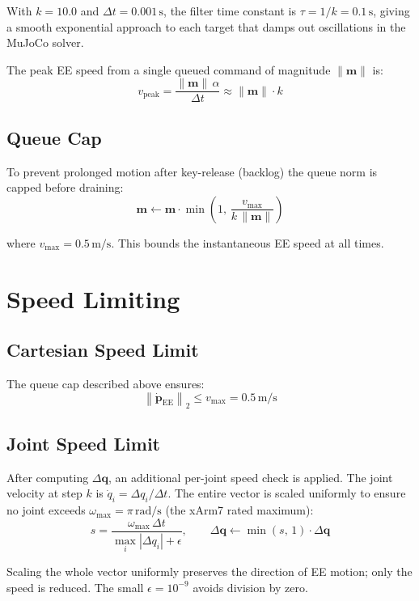 \documentclass[11pt, a4paper]{article}
\begin{document}
With $k = 10.0$ and $\Delta t = 0.001\,\text{s}$, the filter time constant is $\tau = 1/k = 0.1\,\text{s}$, giving a smooth exponential approach to each target that damps out oscillations in the MuJoCo solver.

The peak EE speed from a single queued command of magnitude $\|\mathbf{m}\|$ is:
\[
  v_{\text{peak}} = \frac{\|\mathbf{m}\|\,\alpha}{\Delta t} \approx \|\mathbf{m}\| \cdot k
\]

\subsection{Queue Cap}

To prevent prolonged motion after key-release (backlog) the queue norm is capped before draining:
\[
  \mathbf{m} \leftarrow \mathbf{m}\cdot\min\!\left(1,\,\frac{v_{\max}}{k\,\|\mathbf{m}\|}\right)
\]

where $v_{\max} = 0.5\,\text{m/s}$. This bounds the instantaneous EE speed at all times.

\section{Speed Limiting}

\subsection{Cartesian Speed Limit}

The queue cap described above ensures:
\[
  \left\|\dot{\mathbf{p}}_{\text{EE}}\right\|_2 \leq v_{\max} = 0.5\,\text{m/s}
\]

\subsection{Joint Speed Limit}

After computing $\Delta \mathbf{q}$, an additional per-joint speed check is applied. The joint velocity at step $k$ is $\dot{q}_i = \Delta q_i / \Delta t$. The entire vector is scaled uniformly to ensure no joint exceeds $\omega_{\max} = \pi\,\text{rad/s}$ (the xArm7 rated maximum):
\[
  s = \frac{\omega_{\max}\,\Delta t}{\max_i |\Delta q_i| + \epsilon}, \qquad
  \Delta \mathbf{q} \leftarrow \min(s,\,1)\cdot\Delta \mathbf{q}
\]

Scaling the whole vector uniformly preserves the direction of EE motion; only the speed is reduced. The small $\epsilon = 10^{-9}$ avoids division by zero.
\end{document}
